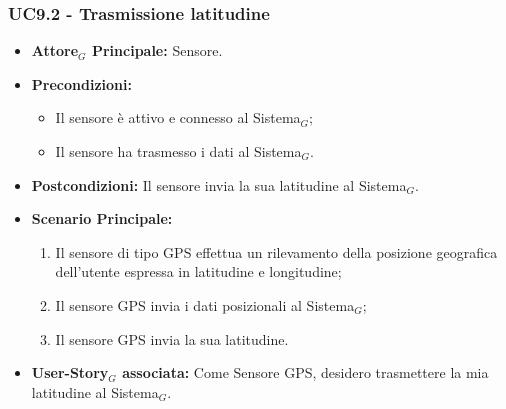\documentclass[10pt]{article}
\begin{document}
\begin{justify}
\subsubsection{\textbf{UC9.2 - Trasmissione latitudine}}
\begin{itemize}
    \item \textbf{Attore$_G$ Principale:} Sensore.
    \item \textbf{Precondizioni:} 
        \begin{itemize}
    	\item Il sensore è attivo e connesso al Sistema$_G$;
          \item Il sensore ha trasmesso i dati al Sistema$_G$.
        \end{itemize}
    \item \textbf{Postcondizioni:} Il sensore invia la sua latitudine al Sistema$_G$.
    \item \textbf{Scenario Principale:} 
        \begin{enumerate}
            \item Il sensore di tipo GPS effettua un rilevamento della posizione geografica dell'utente espressa in latitudine e longitudine;
            \item Il sensore GPS invia i dati posizionali al Sistema$_G$;
            \item Il sensore GPS invia la sua latitudine.
        \end{enumerate}
    \item \textbf{User-Story$_G$ associata:} Come Sensore GPS, desidero trasmettere la mia latitudine al Sistema$_G$.
\end{itemize}

\end{justify}
\end{document}

